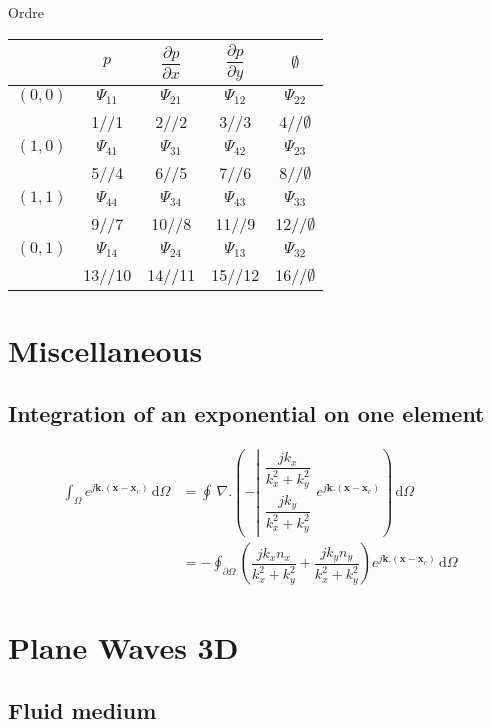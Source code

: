 \documentclass[11pt,A4paper]{book}
\newcommand{\tb}{\textbf}
\newcommand{\pt}{\textbf{.}}
\newcommand{\p}{\partial}
\renewcommand{\div}{\, \nabla \textbf{.}}
\renewcommand{\d}{\,\textrm{d}}
\newcommand{\oiom}{\oint_{\partial \Omega}}
\newcommand{\iom}{\int_{\Omega}}
\renewcommand{\:}{\tb{:}}
\begin{document}
Ordre 
\begin{center}
\begin{tabular}{|c||cccc|} \hline\hline
&{$p$} & {$\dfrac{\p p}{\p x}$}& {$\dfrac{\p p}{\p y}$} &  {$\emptyset$}\\ \hline\hline
{$(0,0)$} &{$\Psi_{11}$} &{$\Psi_{21}$} &{$\Psi_{12}$} &{$\Psi_{22}$} \\
& 1//1 &2//2&3//3&4//$\emptyset$\\
{$(1,0)$} &{$\Psi_{41}$} &{$\Psi_{31}$} &{$\Psi_{42}$} &{$\Psi_{23}$} \\
& 5//4 &6//5&7//6&8//$\emptyset$\\
{$(1,1)$} &{$\Psi_{44}$} &{$\Psi_{34}$} &{$\Psi_{43}$} &{$\Psi_{33}$} \\
& 9//7 &10//8&11//9&12//$\emptyset$\\
{$(0,1)$} &{$\Psi_{14}$} &{$\Psi_{24}$} &{$\Psi_{13}$} &{$\Psi_{32}$} \\
& 13//10 &14//11&15//12&16//$\emptyset$\\
\hline\hline
\end{tabular}
\end{center}



\chapter{Miscellaneous}


\section{Integration of an exponential on one element}
\begin{align}
	\iom e^{j\tb{k}\pt(\tb{x}-\tb{x}_c)}\d\Omega&= \oint \div \left(-\left|\begin{array}{c}
\dfrac{jk_x}{k_x^2+k_y^2}\\
\dfrac{jk_y}{k_x^2+k_y^2}
\end{array}	
\right.
 e^{j\tb{k}\pt(\tb{x}-\tb{x}_c)}\right) \d\Omega\\
&=- \oiom  \left(
\dfrac{jk_xn_x}{k_x^2+k_y^2}+
\dfrac{jk_yn_y}{k_x^2+k_y^2}\right)
 e^{j\tb{k}\pt(\tb{x}-\tb{x}_c)} \d\Omega
\end{align}

\chapter{Plane Waves 3D}


\section{Fluid medium}
\end{document}
